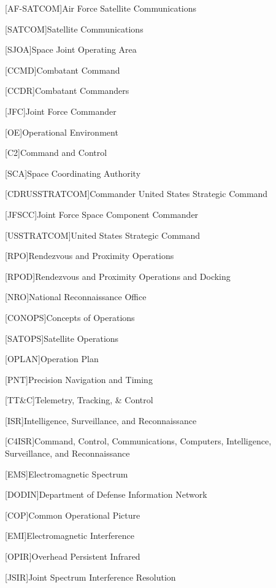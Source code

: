 [AF-SATCOM]{Air Force Satellite Communications}

[SATCOM]{Satellite Communications}

[SJOA]{Space Joint Operating Area}

[CCMD]{Combatant Command}

[CCDR]{Combatant Commanders}

[JFC]{Joint Force Commander}

[OE]{Operational Environment}

[C2]{Command and Control}

[SCA]{Space Coordinating Authority}

[CDRUSSTRATCOM]{Commander United States Strategic Command}

[JFSCC]{Joint Force Space Component Commander}

[USSTRATCOM]{United States Strategic Command}

[RPO]{Rendezvous and Proximity Operations}

[RPOD]{Rendezvous and Proximity Operations and Docking}

[NRO]{National Reconnaissance Office}

[CONOPS]{Concepts of Operations}

[SATOPS]{Satellite Operations}

[OPLAN]{Operation Plan}

[PNT]{Precision Navigation and Timing}

[TT\&C]{Telemetry, Tracking, \& Control}

[ISR]{Intelligence, Surveillance, and Reconnaissance}

[C4ISR]{Command, Control, Communications, Computers, Intelligence, Surveillance, and Reconnaissance}

[EMS]{Electromagnetic Spectrum}

[DODIN]{Department of Defense Information Network}

[COP]{Common Operational Picture}

[EMI]{Electromagnetic Interference}

[OPIR]{Overhead Persistent Infrared}

[JSIR]{Joint Spectrum Interference Resolution}

